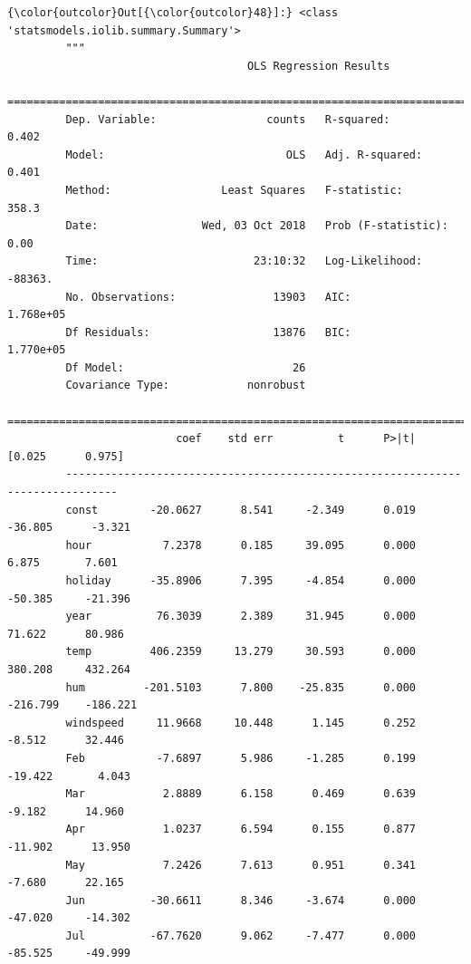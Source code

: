 \documentclass[11pt]{article}
\begin{document}
    
\begin{Verbatim}[commandchars=\\\{\}]
{\color{outcolor}Out[{\color{outcolor}48}]:} <class 'statsmodels.iolib.summary.Summary'>
         """
                                     OLS Regression Results                            
         ==============================================================================
         Dep. Variable:                 counts   R-squared:                       0.402
         Model:                            OLS   Adj. R-squared:                  0.401
         Method:                 Least Squares   F-statistic:                     358.3
         Date:                Wed, 03 Oct 2018   Prob (F-statistic):               0.00
         Time:                        23:10:32   Log-Likelihood:                -88363.
         No. Observations:               13903   AIC:                         1.768e+05
         Df Residuals:                   13876   BIC:                         1.770e+05
         Df Model:                          26                                         
         Covariance Type:            nonrobust                                         
         ==============================================================================
                          coef    std err          t      P>|t|      [0.025      0.975]
         ------------------------------------------------------------------------------
         const        -20.0627      8.541     -2.349      0.019     -36.805      -3.321
         hour           7.2378      0.185     39.095      0.000       6.875       7.601
         holiday      -35.8906      7.395     -4.854      0.000     -50.385     -21.396
         year          76.3039      2.389     31.945      0.000      71.622      80.986
         temp         406.2359     13.279     30.593      0.000     380.208     432.264
         hum         -201.5103      7.800    -25.835      0.000    -216.799    -186.221
         windspeed     11.9668     10.448      1.145      0.252      -8.512      32.446
         Feb           -7.6897      5.986     -1.285      0.199     -19.422       4.043
         Mar            2.8889      6.158      0.469      0.639      -9.182      14.960
         Apr            1.0237      6.594      0.155      0.877     -11.902      13.950
         May            7.2426      7.613      0.951      0.341      -7.680      22.165
         Jun          -30.6611      8.346     -3.674      0.000     -47.020     -14.302
         Jul          -67.7620      9.062     -7.477      0.000     -85.525     -49.999

\end{Verbatim}
\end{document}
